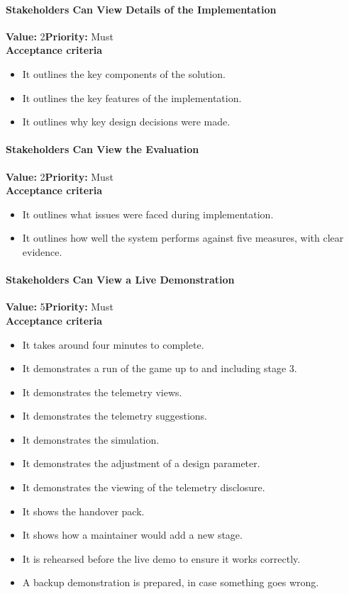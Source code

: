 \paragraph{Stakeholders Can View Details of the Implementation}
\textbf{Value:} 2\quad \textbf{Priority:} Must\\
\textbf{Acceptance criteria}
\begin{itemize}
  \item It outlines the key components of the solution.
  \item It outlines the key features of the implementation.
  \item It outlines why key design decisions were made.
\end{itemize}

\paragraph{Stakeholders Can View the Evaluation}
\textbf{Value:} 2\quad \textbf{Priority:} Must\\
\textbf{Acceptance criteria}
\begin{itemize}
  \item It outlines what issues were faced during implementation.
  \item It outlines how well the system performs against five measures, with clear evidence.
\end{itemize}

\paragraph{Stakeholders Can View a Live Demonstration}
\textbf{Value:} 5\quad \textbf{Priority:} Must\\
\textbf{Acceptance criteria}
\begin{itemize}
  \item It takes around four minutes to complete.
  \item It demonstrates a run of the game up to and including stage 3.
  \item It demonstrates the telemetry views.
  \item It demonstrates the telemetry suggestions.
  \item It demonstrates the simulation.
  \item It demonstrates the adjustment of a design parameter.
  \item It demonstrates the viewing of the telemetry disclosure.
  \item It shows the handover pack.
  \item It shows how a maintainer would add a new stage.
  \item It is rehearsed before the live demo to ensure it works correctly.
  \item A backup demonstration is prepared, in case something goes wrong.
\end{itemize}

